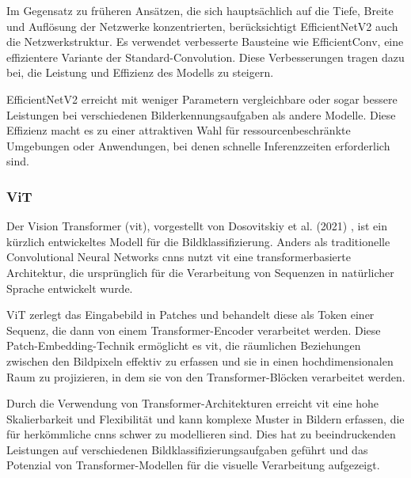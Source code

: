 Im Gegensatz zu früheren Ansätzen, die sich hauptsächlich auf die Tiefe, Breite und Auflösung der Netzwerke konzentrierten, berücksichtigt EfficientNetV2 auch die Netzwerkstruktur. Es verwendet verbesserte Bausteine wie EfficientConv, eine effizientere Variante der Standard-Convolution. Diese Verbesserungen tragen dazu bei, die Leistung und Effizienz des Modells zu steigern.

EfficientNetV2 erreicht mit weniger Parametern vergleichbare oder sogar bessere Leistungen bei verschiedenen Bilderkennungsaufgaben als andere Modelle. Diese Effizienz macht es zu einer attraktiven Wahl für ressourcenbeschränkte Umgebungen oder Anwendungen, bei denen schnelle Inferenzzeiten erforderlich sind.

\subsubsection{ViT}
Der Vision Transformer (\acrshort{vit}), vorgestellt von Dosovitskiy et al. (2021) \cite{dosovitskiy_image_2021}, ist ein kürzlich entwickeltes Modell für die Bildklassifizierung. Anders als traditionelle Convolutional Neural Networks \acrshort{cnn}s nutzt \acrshort{vit} eine transformerbasierte Architektur, die ursprünglich für die Verarbeitung von Sequenzen in natürlicher Sprache entwickelt wurde.

ViT zerlegt das Eingabebild in Patches und behandelt diese als Token einer Sequenz, die dann von einem Transformer-Encoder verarbeitet werden. Diese Patch-Embedding-Technik ermöglicht es \acrshort{vit}, die räumlichen Beziehungen zwischen den Bildpixeln effektiv zu erfassen und sie in einen hochdimensionalen Raum zu projizieren, in dem sie von den Transformer-Blöcken verarbeitet werden.

Durch die Verwendung von Transformer-Architekturen erreicht \acrshort{vit} eine hohe Skalierbarkeit und Flexibilität und kann komplexe Muster in Bildern erfassen, die für herkömmliche \acrshort{cnn}s schwer zu modellieren sind. Dies hat zu beeindruckenden Leistungen auf verschiedenen Bildklassifizierungsaufgaben geführt und das Potenzial von Transformer-Modellen für die visuelle Verarbeitung aufgezeigt.